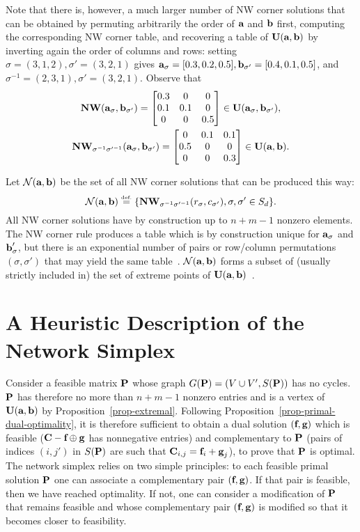 Note that there is, however, a much larger number of NW corner solutions that can be obtained by permuting arbitrarily the order of $\a$ and $\b$ first, computing the corresponding NW corner table, and recovering a table of $\CouplingsD(\a,\b)$ by inverting again the order of columns and rows: setting $\sigma=(3,1,2),\sigma'=(3,2,1)$ gives $\a_\sigma=[0.3,0.2,0.5], \b_{\sigma'}=[0.4,0.1,0.5]$, and $\sigma^{-1}=(2,3,1),\sigma'=(3,2,1)$. Observe that
\begin{gather*}
\NW(\a_\sigma,\b_{\sigma'}) = \begin{bmatrix} 0.3 & 0 & 0 \\ 0.1 & 0.1 & 0 \\ 0& 0 & 0.5\end{bmatrix} \in \CouplingsD(\a_\sigma,\b_{\sigma'}),\\
\NW_{\sigma^{-1}\sigma'^{-1}}(\a_\sigma,\b_{\sigma'})= \begin{bmatrix} 0 & 0.1 & 0.1 \\ 0.5 & 0 & 0 \\ 0& 0 & 0.3\end{bmatrix}\in \CouplingsD(\a,\b).
\end{gather*}

Let $\mathcal{N}(\a,\b)$ be the set of all NW corner solutions that can be produced this way:
$$\mathcal{N}(\a,\b)\eqdef\{ \NW_{\sigma^{-1}\sigma'^{-1}}(r_\sigma,c_{\sigma'}), \sigma,\sigma'\in S_d\}.$$
All NW corner solutions have by construction up to $n+m-1$ nonzero elements. The NW corner rule produces a table which is by construction unique for $\a_\sigma$ and $\b_\sigma'$, but there is an exponential number of pairs or row/column permutations $(\sigma,\sigma')$ that may yield the same table~\citep[p. 2]{stougie2002polynomial}. $\mathcal{N}(\a,\b)$ forms a subset of (usually strictly included in) the set of extreme points of $\CouplingsD(\a,\b)$~\citep[Cor. 8.1.4]{brualdi2006combinatorial}.



\section{A Heuristic Description of the Network Simplex}\label{s-networksimplex}

Consider a feasible matrix $\P$ whose graph $G(\P)=(V\cup V',S(\P))$ has no cycles. $\P$ has therefore no more than $n+m-1$ nonzero entries and is a vertex of $\CouplingsD(\a,\b)$ by Proposition~\ref{prop-extremal}. 
%
Following Proposition~\ref{prop-primal-dual-optimality}, it is therefore sufficient to obtain a dual solution $(\fD,\gD)$ which is feasible (\ie $\C-\fD\oplus\gD$ has nonnegative entries) and complementary to $\P$ (pairs of indices $(i,j')$ in $S(\P)$ are such that $\C_{i,j}=\fD_i+\gD_j$), to prove that $\P$ is optimal. 
%
The network simplex relies on two simple principles: to each feasible primal solution $\P$ one can associate a complementary pair $(\fD,\gD)$. 
%
If that pair is feasible, then we have reached optimality. If not, one can consider a modification of $\P$ that remains feasible and whose complementary pair $(\fD,\gD)$ is modified so that it becomes closer to feasibility.

